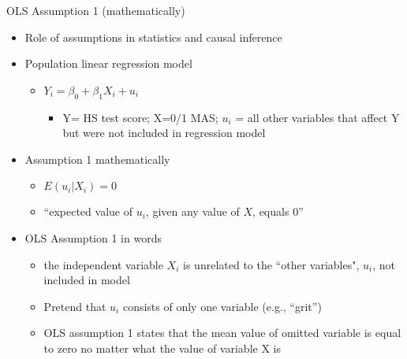 \begin{frame}{OLS Assumption 1 (mathematically)}
	\begin{itemize}
	\item Role of assumptions in statistics and causal inference
	\item Population linear regression model
		\begin{itemize}
		\item $Y_{i} = \beta_{0} + \beta_{1}X_{i} + u_{i}$
			\begin{itemize}
			\item Y= HS test score; X=0/1 MAS; $u_{i}$ = all other variables that affect Y but were not included in regression model
			\end{itemize}
		\end{itemize}
	\item Assumption 1 mathematically
		\begin{itemize}
			\item $E(u_{i}|X_{i}) = 0$
			\item ``expected value of $u_{i}$, given any value of $X$, equals $0$''
		\end{itemize}
	\item OLS Assumption 1 in words
		\begin{itemize}
		\item the independent variable $X_{i}$ is unrelated to the ``other variables", $u_{i}$, not included in model
				
			\item Pretend that $u_{i}$ consists of only one variable (e.g., ``grit'')
			\item OLS assumption 1 states that the mean value of omitted variable is equal to zero no matter what the value of variable X is			
		\end{itemize}

	\end{itemize}
\end{frame}



